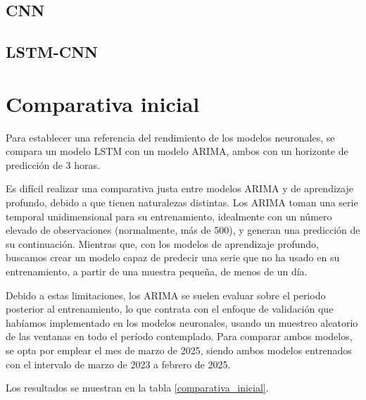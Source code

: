 \subsection{CNN}

\subsection{LSTM-CNN}


\section{Comparativa inicial}
Para establecer una referencia del rendimiento de los modelos neuronales, se compara un modelo LSTM con un modelo ARIMA, ambos con un horizonte de predicción de 3 horas.

Es difícil realizar una comparativa justa entre modelos ARIMA y de aprendizaje profundo, debido a que tienen naturalezas distintas.
Los ARIMA toman una serie temporal unidimensional para su entrenamiento, idealmente con un número elevado de observaciones (normalmente, más de 500),
 y generan una predicción de su continuación. Mientras que, con los modelos de aprendizaje profundo, buscamos crear un modelo capaz de predecir
una serie que no ha usado en su entrenamiento, a partir de una muestra pequeña, de menos de un día.  


Debido a estas limitaciones, los ARIMA se suelen evaluar sobre el periodo posterior al entrenamiento, lo que contrata con el enfoque de validación que habíamos implementado 
en los modelos neuronales, usando un muestreo aleatorio de las ventanas en todo el período contemplado.
Para comparar ambos modelos, se opta por emplear el mes de marzo de 2025, siendo ambos modelos entrenados con el intervalo de marzo de 2023 a febrero de 2025.  


Los resultados se muestran en la tabla \ref{comparativa_inicial}.

